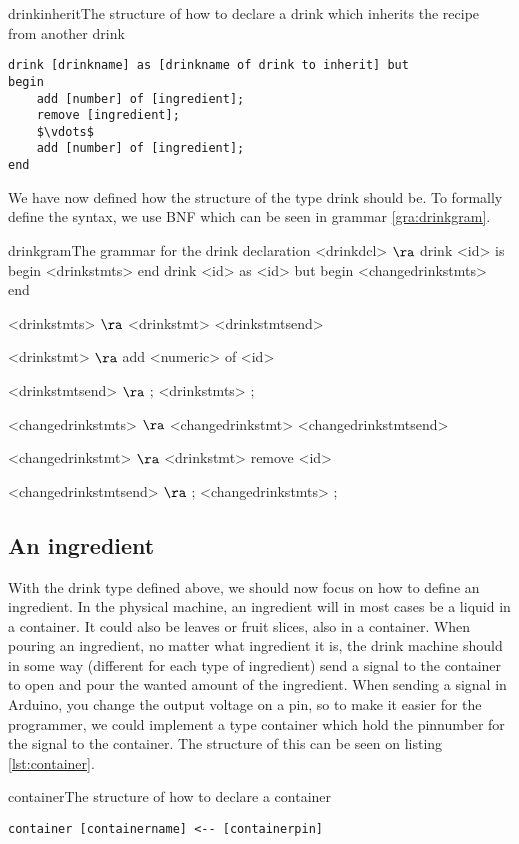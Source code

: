 \begin{code}{drinkinherit}{The structure of how to declare a drink which inherits the recipe from another drink}
\begin{lstlisting}[mathescape]
drink [drinkname] as [drinkname of drink to inherit] but
begin
	add [number] of [ingredient];
	remove [ingredient];
	$\vdots$
	add [number] of [ingredient];
end
\end{lstlisting}
\end{code}

We have now defined how the structure of the type drink should be. To formally define the syntax, we use BNF which can be seen in grammar \ref{gra:drinkgram}.

\begin{grammatik}{drinkgram}{The grammar for the drink declaration}
<drinkdcl> $\ra$ drink <id> is begin <drinkstmts> end
\alt drink <id> as <id> but begin <changedrinkstmts> end

<drinkstmts> $\ra$ <drinkstmt> <drinkstmtsend>

<drinkstmt> $\ra$ add <numeric> of <id>

<drinkstmtsend> $\ra$ ; <drinkstmts>
\alt ;

<changedrinkstmts> $\ra$ <changedrinkstmt> <changedrinkstmtsend>

<changedrinkstmt> $\ra$ <drinkstmt>
\alt remove <id>

<changedrinkstmtsend> $\ra$ ; <changedrinkstmts>
\alt ;
\end{grammatik}

\subsection{An ingredient}
With the drink type defined above, we should now focus on how to define an ingredient. In the physical machine, an ingredient will in most cases be a liquid in a container. It could also be leaves or fruit slices, also in a container. When pouring an ingredient, no matter what ingredient it is, the drink machine should in some way (different for each type of ingredient) send a signal to the container to open and pour the wanted amount of the ingredient. When sending a signal in Arduino, you change the output voltage on a pin, so to make it easier for the programmer, we could implement a type container which hold the pinnumber for the signal to the container. The structure of this can be seen on listing \ref{lst:container}.

\begin{code}{container}{The structure of how to declare a container}
\begin{lstlisting}[mathescape]
container [containername] <-- [containerpin]
\end{lstlisting}
\end{code}

